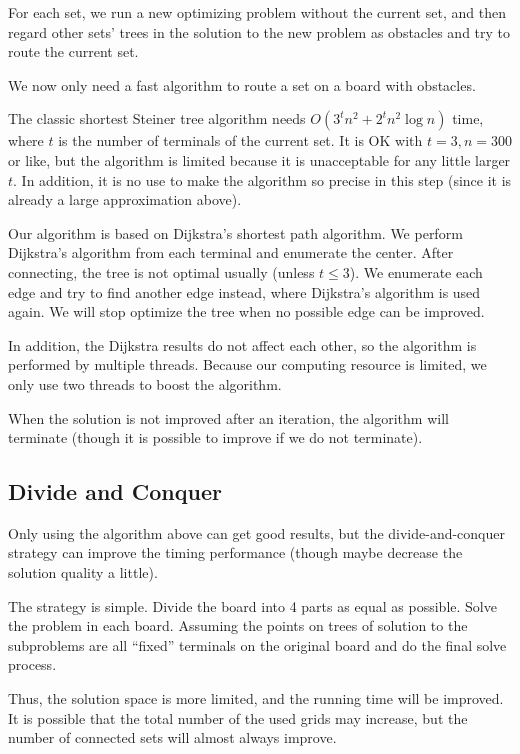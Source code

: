 \documentclass[12pt, a4paper]{article}
\begin{document}
	For each set, we run a new optimizing problem without the current set, and then regard other sets' trees in the solution to the new problem as obstacles and try to route the current set.
	
	We now only need a fast algorithm to route a set on a board with obstacles.
	
	The classic shortest Steiner tree algorithm needs $O(3^t n^2 + 2^t n^2 \log n)$ time, where $t$ is the number of terminals of the current set. It is OK with $t = 3, n = 300$ or like, but the algorithm is limited because it is unacceptable for any little larger $t$. In addition, it is no use to make the algorithm so precise in this step (since it is already a large approximation above).
	
	Our algorithm is based on Dijkstra's shortest path algorithm. We perform Dijkstra's algorithm from each terminal and enumerate the center. After connecting, the tree is not optimal usually (unless $t \leq 3$). We enumerate each edge and try to find another edge instead, where Dijkstra's algorithm is used again. We will stop optimize the tree when no possible edge can be improved.
	
	In addition, the Dijkstra results do not affect each other, so the algorithm is performed by multiple threads. Because our computing resource is limited, we only use two threads to boost the algorithm.
	
	When the solution is not improved after an iteration, the algorithm will terminate (though it is possible to improve if we do not terminate).
	
	\subsection{Divide and Conquer}
	
	Only using the algorithm above can get good results, but the divide-and-conquer strategy can improve the timing performance (though maybe decrease the solution quality a little).
	
	The strategy is simple. Divide the board into 4 parts as equal as possible. Solve the problem in each board. Assuming the points on trees of solution to the subproblems are all ``fixed'' terminals on the original board and do the final solve process.
	
	Thus, the solution space is more limited, and the running time will be improved. It is possible that the total number of the used grids may increase, but the number of connected sets will almost always improve.
	
\end{document}
